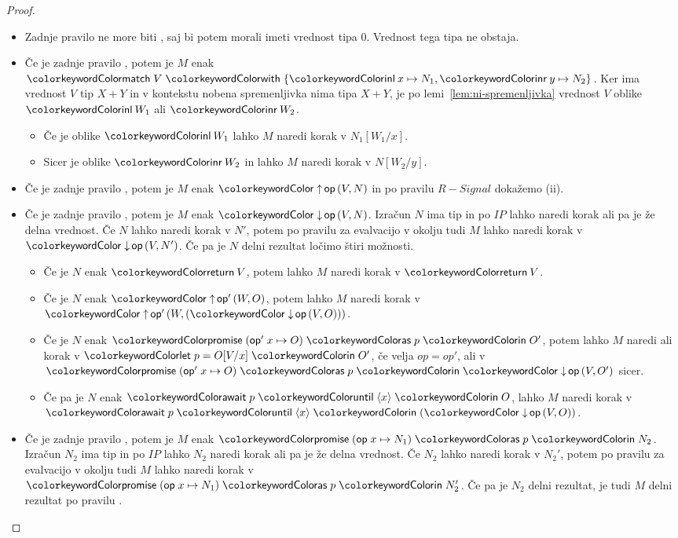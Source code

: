 \begin{proof}
\begin{itemize}
		\item Zadnje pravilo ne more biti , saj bi potem morali imeti vrednost tipa $0$. Vrednost tega tipa ne obstaja.
		
		\item Če je zadnje pravilo , potem je $M$ enak $\tmmatch{V}{\tminl{x} \mapsto N_1, \tminr{y} \mapsto N_2}$.
		Ker ima vrednost $V$ tip $X + Y$ in v kontekstu nobena spremenljivka nima tipa $X + Y$, je po lemi~\ref{lem:ni-spremenljivka} vrednost $V$ oblike $\tminl{W_1}$ ali $\tminr{W_2}$.
		\begin{itemize}
			\item Če je oblike $\tminl{W_1}$ lahko $M$ naredi korak v $N_1[W_1/x]$.
			\item Sicer je oblike $\tminr{W_2}$ in lahko $M$ naredi korak v $N[W_2/y]$.
		\end{itemize}
		
		\item Če je zadnje pravilo , potem je $M$ enak $\tmopout{op}{V}{N}$ in po pravilu $R-Signal$ dokažemo (ii).
		
		\item Če je zadnje pravilo , potem je $M$ enak $\tmopin{op}{V}{N}$. Izračun $N$ ima tip in po $IP$ lahko naredi korak ali pa je že delna vrednost. Če $N$ lahko naredi korak v $N'$, potem po pravilu za evalvacijo v okolju tudi $M$ lahko naredi korak v $\tmopin{op}{V}{N'}$. 
		Če pa je $N$ delni rezultat ločimo štiri možnosti.
		\begin{itemize}
			\item Če je $N$ enak $\tmreturn{V}$, potem lahko $M$ naredi korak v $\tmreturn{V}$.
			\item Če je $N$ enak $\tmopout{op'}{W}{O}$, potem lahko $M$ naredi korak v $\tmopout{op'}{W}{(\tmopin{op}{V}{O})}$.
			\item Če je $N$ enak $\tmwith{op'}{x}{O}{p}{O'}$, potem lahko $M$ naredi ali korak v $\tmlet{p}{O[V/x]}{O'}$, če velja $op = op'$, ali v $\tmwith{op'}{x}{O}{p}{\tmopin{op}{V}{O'}}$ sicer.
			\item Če pa je $N$ enak $\tmawait{p}{x}{O}$, lahko $M$ naredi korak v $\tmawait{p}{x}{(\tmopin{op}{V}{O})}$.
		\end{itemize}
		
		
		\item Če je zadnje pravilo , potem je $M$ enak $\tmwith{op}{x}{N_1}{p}{N_2}$. Izračun $N_2$ ima tip in po $IP$ lahko $N_2$ naredi korak ali pa je že delna vrednost. Če $N_2$ lahko naredi korak v $N_2'$, potem po pravilu za evalvacijo v okolju tudi $M$ lahko naredi korak v $\tmwith{op}{x}{N_1}{p}{N_2'}$.
		Če pa je $N_2$ delni rezultat, je tudi $M$ delni rezultat po pravilu .
		

\end{itemize}
\end{proof}
